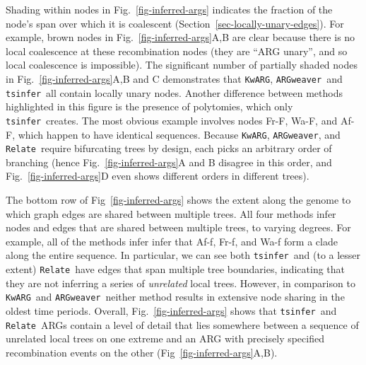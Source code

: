 \documentclass{article}
\newcommand{\noderef}[1]{\textsf{#1}}
\newcommand{\tsinfer}[0]{\texttt{tsinfer}}
\newcommand{\kwarg}[0]{\texttt{KwARG}}
\newcommand{\argweaver}[0]{\texttt{ARGweaver}}
\newcommand{\relate}[0]{\texttt{Relate}}
\begin{document}
Shading within nodes in Fig.~\ref{fig-inferred-args} indicates the
fraction of the node's span over which it is coalescent
(Section~\ref{sec-locally-unary-edges}). For example, brown nodes
in Fig.~\ref{fig-inferred-args}A,B are clear because there is
no local coalescence at these recombination nodes
(they are ``ARG unary'', and so local coalescence is impossible).
The significant number of partially shaded nodes in
Fig.~\ref{fig-inferred-args}A,B and C demonstrates that
\kwarg, \argweaver\ and \tsinfer\ all contain locally unary nodes.
Another difference between methods highlighted in this figure
is the presence of polytomies, which only
\tsinfer\ creates. The most obvious example
involves nodes \noderef{Fr-F}, \noderef{Wa-F}, and \noderef{Af-F},
which happen to have identical sequences.
Because \kwarg, \argweaver, and \relate\ require
bifurcating trees by design, each picks an arbitrary order of branching
(hence Fig.~\ref{fig-inferred-args}A and B disagree
in this order, and Fig.~\ref{fig-inferred-args}D even shows different
orders in different trees).

The bottom row of Fig~\ref{fig-inferred-args} shows the extent along
the genome to which graph edges are shared between multiple trees.
All four methods infer nodes and edges that are shared between
multiple trees, to varying degrees.
For example, all of the methods infer
infer that \noderef{Af-f}, \noderef{Fr-f}, and \noderef{Wa-f}
form a clade along the entire sequence.
In particular, we can
see both \tsinfer\ and (to a lesser extent) \relate\ have edges
that span multiple tree boundaries, indicating that they are not inferring
a series of \emph{unrelated} local trees.
However, in comparison to \kwarg\ and \argweaver\ neither
method results in extensive node sharing in the
oldest time periods.
Overall, Fig.~\ref{fig-inferred-args} shows
that \tsinfer\ and \relate\ ARGs contain a level of detail
that lies somewhere between a sequence of unrelated local trees on one extreme
and an ARG with precisely specified recombination events on the other
(Fig~\ref{fig-inferred-args}A,B).
\end{document}
